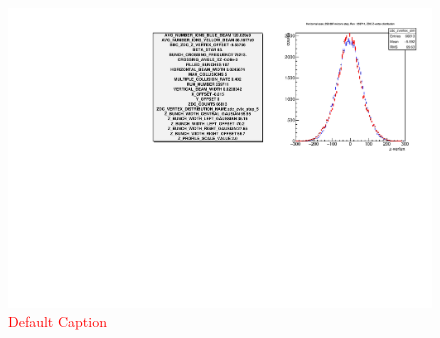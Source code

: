 \begin{figure}
\begin{center}
\includegraphics[width=\linewidth,height=\textheight,keepaspectratio]{../HourglassCorrection/figs/359711_step05_config_compare}
\caption{ \textcolor{red}{Default Caption} }
\label{fig:359711_step05_config_compare}
\end{center}
\end{figure}